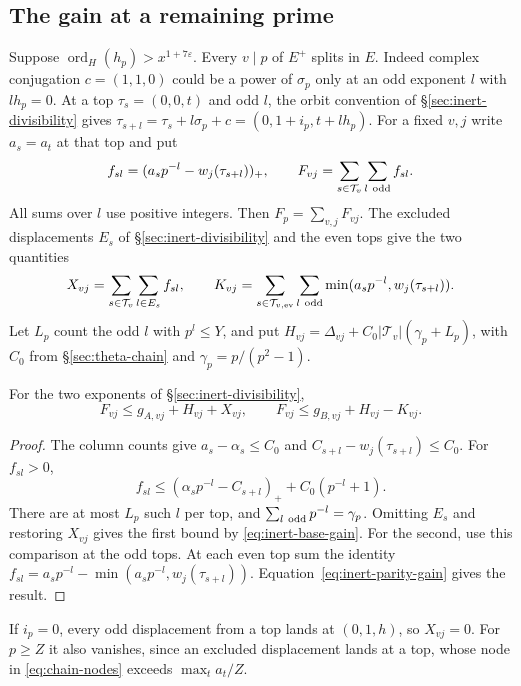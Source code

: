 \subsection{The gain at a remaining prime}

Suppose $\operatorname{ord}_H(h_p)>x^{1+7\varepsilon}$.
Every $v\mid p$ of $E^+$ splits in $E$. Indeed complex conjugation
$c=(1,1,0)$ could be a power of $\sigma_p$ only at an odd exponent $l$
with $lh_p=0$. At a top $\tau_s=(0,0,t)$ and odd $l$, the orbit
convention of \S\ref{sec:inert-divisibility} gives
$\tau_{s+l}=\tau_s+l\sigma_p+c=(0,1+i_p,t+lh_p)$.
For a fixed $v,j$ write $a_s=a_t$ at that top and put
\[
 f_{sl}=(a_sp^{-l}-w_j(\tau_{s+l}))_+,\qquad
 F_{vj}=\sum_{s\in\mathcal T_v}\sum_{l\ {\rm odd}}f_{sl}.
\]
All sums over $l$ use positive integers. Then $F_p=\sum_{v,j}F_{vj}$.
The excluded displacements $E_s$ of \S\ref{sec:inert-divisibility}
and the even tops give the two quantities
\[
 X_{vj}=\sum_{s\in\mathcal T_v}\sum_{l\in E_s} f_{sl},\qquad
 K_{vj}=\sum_{s\in\mathcal T_{v,{\rm ev}}}\sum_{l\ {\rm odd}}
                    \min(a_sp^{-l},w_j(\tau_{s+l})).
\]
Let $L_p$ count the odd $l$ with $p^l\le Y$, and put
$H_{vj}=\Delta_{vj}+C_0|\mathcal T_v|(\gamma_p+L_p)$, with $C_0$
from \S\ref{sec:theta-chain} and $\gamma_p=p/(p^2-1)$.

\begin{lemma}\label{lem:loss-orbit}
For the two exponents of \S\ref{sec:inert-divisibility},
\[
 F_{vj}\le g_{A,vj}+H_{vj}+X_{vj},\qquad
 F_{vj}\le g_{B,vj}+H_{vj}-K_{vj}.
\]
\end{lemma}

\begin{proof}
The column counts give $a_s-\alpha_s\le C_0$ and
$C_{s+l}-w_j(\tau_{s+l})\le C_0$. For $f_{sl}>0$,
\[
 f_{sl}\le(\alpha_s p^{-l}-C_{s+l})_++C_0(p^{-l}+1).
\]
There are at most $L_p$ such $l$ per top, and $\sum_{l\ {\rm odd}}p^{-l}
=\gamma_p$. Omitting $E_s$ and restoring $X_{vj}$ gives the first
bound by \eqref{eq:inert-base-gain}. For the second, use this comparison
at the odd tops. At each even top sum the identity
$f_{sl}=a_sp^{-l}-\min(a_sp^{-l},w_j(\tau_{s+l}))$.
Equation~\eqref{eq:inert-parity-gain} gives the result.
\end{proof}

If $i_p=0$, every odd displacement from a top lands at $(0,1,h)$,
so $X_{vj}=0$. For $p\ge Z$ it also vanishes, since an excluded
displacement lands at a top, whose node in \eqref{eq:chain-nodes}
exceeds $\max_t a_t/Z$.

